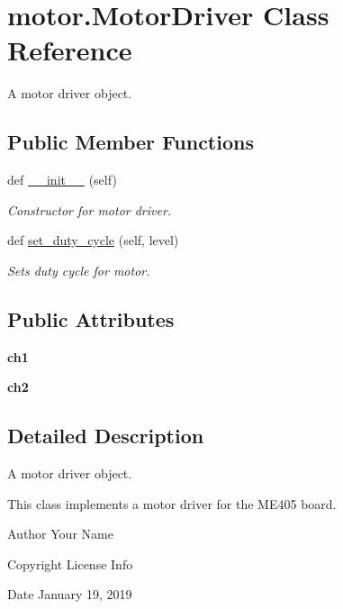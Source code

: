\hypertarget{classmotor_1_1_motor_driver}{}\section{motor.\+Motor\+Driver Class Reference}
\label{classmotor_1_1_motor_driver}


A motor driver object.  


\subsection*{Public Member Functions}
\begin{DoxyCompactItemize}
\item 
def \mbox{\hyperlink{classmotor_1_1_motor_driver_a9e10ee95953b802b06ad4b9b3b6e35b9}{\+\_\+\+\_\+init\+\_\+\+\_\+}} (self)
\begin{DoxyCompactList}\small\item\em Constructor for motor driver. \end{DoxyCompactList}\item 
def \mbox{\hyperlink{classmotor_1_1_motor_driver_a51b4721406aa66e0807413199b8b700f}{set\+\_\+duty\+\_\+cycle}} (self, level)
\begin{DoxyCompactList}\small\item\em Sets duty cycle for motor. \end{DoxyCompactList}\end{DoxyCompactItemize}
\subsection*{Public Attributes}
\begin{DoxyCompactItemize}
\item 
\mbox{\label{classmotor_1_1_motor_driver_ab59ff180f9593d716a60d0177cd8564e}} 
{\bfseries ch1}
\item 
\mbox{\label{classmotor_1_1_motor_driver_af47581f527f4163d62810c617e081001}} 
{\bfseries ch2}
\end{DoxyCompactItemize}


\subsection{Detailed Description}
A motor driver object. 

This class implements a motor driver for the M\+E405 board. \begin{DoxyAuthor}{Author}
Your Name 
\end{DoxyAuthor}
\begin{DoxyCopyright}{Copyright}
License Info 
\end{DoxyCopyright}
\begin{DoxyDate}{Date}
January 19, 2019 
\end{DoxyDate}


